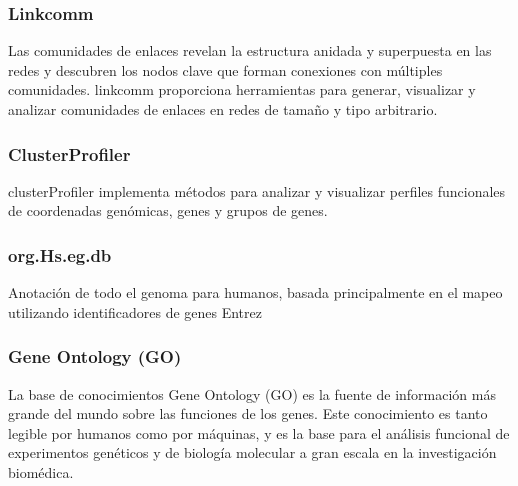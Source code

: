 \subsubsection{Linkcomm}

Las comunidades de enlaces revelan la estructura anidada y superpuesta en las redes y descubren los nodos clave que forman conexiones con múltiples comunidades. linkcomm \cite{Linkcomm_paper} proporciona herramientas para generar, visualizar y analizar comunidades de enlaces en redes de tamaño y tipo arbitrario.

\subsubsection{ClusterProfiler}

clusterProfiler \cite{ClusterProfiler_paper}implementa métodos para analizar y visualizar perfiles funcionales de coordenadas genómicas, genes y grupos de genes.

\subsubsection{org.Hs.eg.db} 

Anotación de todo el genoma para humanos, basada principalmente en el mapeo utilizando identificadores de genes Entrez

\subsubsection{Gene Ontology (GO)}

La base de conocimientos Gene Ontology (GO) \cite{GO_paper} es la fuente de información más grande del mundo sobre las funciones de los genes. Este conocimiento es tanto legible por humanos como por máquinas, y es la base para el análisis funcional de experimentos genéticos y de biología molecular a gran escala en la investigación biomédica.






\hfill




\newpage